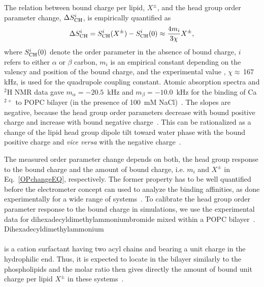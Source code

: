 \documentclass[aip,jcp,twocolumn]{revtex4}
\begin{document}
The relation between bound charge per lipid,  $X^\pm$, and
the head group order parameter change, $\Delta S_{\rm{CH}}^{i}$,
is empirically quantified as~\cite{seelig87,ferreira16}
\begin{equation}\label{OPchangeEQ}
  \Delta S_{\rm{CH}}^{i}= S_{\rm{CH}}^{i}(X^\pm)-S_{\rm{CH}}^{i}(0) \approx \frac{4m_i }{3\chi}X^\pm,
\end{equation}
where $S_{\rm{CH}}^{i}(0)$ denote the order parameter in the absence of bound charge,
$i$ refers to either $\alpha$ or $\beta$ carbon,
$m_i$ is an empirical constant depending on the valency and position of the bound charge,
and the experimental value \cite{seelig77,davis83}, $\chi \approx$\,167\,kHz, is used for the quadrupole coupling constant.
Atomic absorption spectra and $^2$H NMR data gave
$m_\alpha=-20.5$~kHz  and $m_\beta=-10.0$~kHz for the binding of
Ca$^{2+}$ to POPC bilayer (in the presence of 100~mM NaCl)~\cite{altenbach84,ollila16,catte16}.
The slopes are negative, because the head group order parameters
decrease with bound positive charge and increase with bound negative
charge~\cite{ollila16,catte16}. This can be rationalized as a change
of the lipid head group dipole tilt toward water phase with the bound positive
charge and {\it vice versa} with the negative charge~\cite{seelig87}. 

The measured order parameter change depends on both, the head group response 
to the bound charge and the amount of bound charge, i.e. $m_i$ and $X^\pm$
in Eq.~\ref{OPchangeEQ}, respectively. The former property has to be
well quantified before the electrometer concept can used to 
analyze the binding affinities, as done experimentally for a wide range
of systems~\cite{seelig87,beschiasvili91}. To calibrate 
the head group order parameter response to the bound charge in simulations,
we use the experimental data for dihexadecyldimethylammoniumbromide %
mixed within a POPC bilayer~\cite{scherer89}. Dihexadecyldimethylammonium\\[0.5cm]
\vspace{0.5cm} \\
is a cation surfactant having two acyl chains and bearing a unit
charge in the hydrophilic end. Thus, it is expected to locate
in the bilayer similarly to the phospholipids and the molar ratio then 
gives directly the amount of bound unit charge per lipid $X^\pm$ in these systems~\cite{scherer89}.
\end{document}
